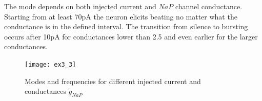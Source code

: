 \documentclass[a4paper,11pt]{article} %
\begin{document}
The mode depends on both injected current and $NaP$ channel conductance.
Starting from at least 70pA the neuron elicits beating no matter what the conductance is
in the defined interval. The transition from silence to bursting occurs after 10pA
for conductances lower than 2.5 and even earlier for the larger conductances.

\begin{figure}[H]
    \centering
    \texttt{[image: ex3\_3]}
    \caption{Modes and frequencies for different injected current and conductances $\tilde{g}_{NaP}$}
    \label{fig:modes}
\end{figure}
\end{document}
